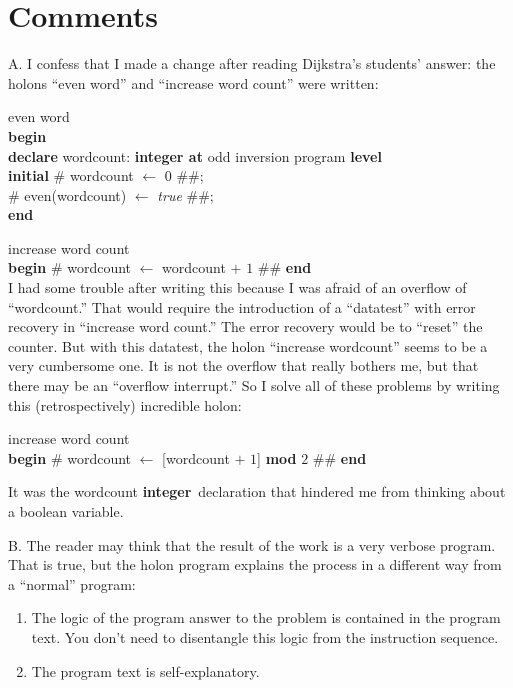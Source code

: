 \documentclass[openany,nobib]{tufte-book}
\newcommand{\kw}[1]{{\bf #1}}
\begin{document}
\clearpage

\section{Comments}

A. I confess that I made a change after reading Dijkstra's students' answer:
the holons ``even word'' and ``increase word count'' were written:

\bigskip

\noindent even word\\
\-\hspace{0.2cm} \kw{begin} \\
\-\hspace{0.4cm} \kw{declare} wordcount: \kw{integer at} odd inversion
program \kw{level}\\
\-\hspace{0.4cm} \kw{initial} \# wordcount $\gets$ $0$ \#\#;\\
\-\hspace{0.4cm} \# even(wordcount) $\gets$ {\it true} \#\#;\\
\-\hspace{0.2cm} \kw{end}

\bigskip

\noindent increase word count\\
\-\hspace{0.2cm} \kw{begin} \# wordcount $\gets$ wordcount $+$ $1$ \#\#
\kw{end} \\

\medskip
\noindent
I had some trouble after writing this because I was afraid of an overflow of
``wordcount.'' That would require the introduction of a ``datatest'' with error
recovery in ``increase word count.'' The error recovery would be to ``reset''
the counter. But with this datatest, the holon ``increase wordcount'' seems to
be a very cumbersome one. It is not the overflow that really bothers me, but
that there may be an ``overflow interrupt.'' So I solve all of these problems
by writing this (retrospectively) incredible holon:

\bigskip
\noindent
increase word count\\
\-\hspace{0.2cm} \kw{begin} \# wordcount $\gets$ [wordcount $+$ $1$] \kw{mod}
$2$
\#\# \kw{end}

\bigskip
\noindent
It was the wordcount \kw{integer}\ declaration that hindered me from thinking
about a
boolean variable.

\medskip
\noindent
B. The reader may think that the result of the work is a very verbose program.
That is true, but the holon program explains the process in a different way
from a ``normal'' program:
\begin{enumerate}
    \item The logic of the program answer to the problem is contained in the
program text. You don't need to disentangle this logic from the instruction
sequence.
    \item The program text is self-explanatory.
\end{enumerate}
\end{document}
